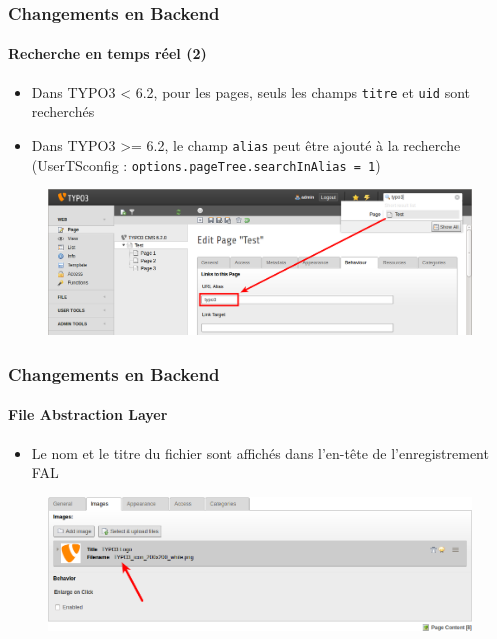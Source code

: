 
\begin{frame}[fragile]
	\frametitle{Changements en Backend}
	\framesubtitle{Recherche en temps réel (2)}

	\begin{itemize}
		\item Dans TYPO3 < 6.2, pour les pages, seuls les champs \texttt{titre} et \texttt{uid} sont recherchés
		\item Dans TYPO3 >= 6.2, le champ \texttt{alias} peut être ajouté à la recherche\newline
			(UserTSconfig : \texttt{options.pageTree.searchInAlias = 1})
	\end{itemize}

	\begin{figure}
		\includegraphics[width=0.95\linewidth]{Images/BackendChanges/LiveSearchInAlias.png}
	\end{figure}

\end{frame}


\begin{frame}[fragile]
	\frametitle{Changements en Backend}
	\framesubtitle{File Abstraction Layer}

	\begin{itemize}
		\item Le nom et le titre du fichier sont affichés dans l'en-tête de l'enregistrement FAL
	\end{itemize}

	\begin{figure}
		\includegraphics[width=0.95\linewidth]{Images/BackendChanges/FalTitleAndFilename.png}
	\end{figure}

\end{frame}

